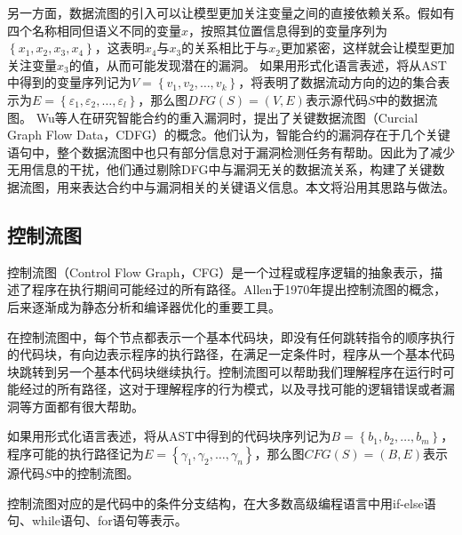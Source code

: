 
另一方面，数据流图的引入可以让模型更加关注变量之间的直接依赖关系。假如有四个名称相同但语义不同的变量$x$，按照其位置信息得到的变量序列为$\left\{x_1, x_2, x_3, x_4\right\}$，这表明$x_4$与$x_3$的关系相比于与$x_2$更加紧密，这样就会让模型更加关注变量$x_3$的值，从而可能发现潜在的漏洞。
如果用形式化语言表述，将从AST中得到的变量序列记为$V=\left\{v_1, v_2, \ldots, v_k\right\}$，将表明了数据流动方向的边的集合表示为$E=\left\{\varepsilon_1, \varepsilon_2, \ldots, \varepsilon_l\right\}$，那么图$DFG(S)=(V, E)$表示源代码$S$中的数据流图。
Wu等人\cite{wu2021peculiar}在研究智能合约的重入漏洞时，提出了关键数据流图（Curcial Graph Flow Data，CDFG）的概念。他们认为，智能合约的漏洞存在于几个关键语句中，整个数据流图中也只有部分信息对于漏洞检测任务有帮助。因此为了减少无用信息的干扰，他们通过剔除DFG中与漏洞无关的数据流关系，构建了关键数据流图，用来表达合约中与漏洞相关的关键语义信息。本文将沿用其思路与做法。
\subsection{控制流图}
\label{sec:控制流图}

控制流图（Control Flow Graph，CFG）是一个过程或程序逻辑的抽象表示，描述了程序在执行期间可能经过的所有路径。Allen于1970年提出控制流图的概念\cite{allencfg}，后来逐渐成为静态分析和编译器优化的重要工具。

在控制流图中，每个节点都表示一个基本代码块，即没有任何跳转指令的顺序执行的代码块，有向边表示程序的执行路径，在满足一定条件时，程序从一个基本代码块跳转到另一个基本代码块继续执行。控制流图可以帮助我们理解程序在运行时可能经过的所有路径，这对于理解程序的行为模式，以及寻找可能的逻辑错误或者漏洞等方面都有很大帮助。

如果用形式化语言表述，将从AST中得到的代码块序列记为$B=\left\{b_1, b_2,\ldots, b_m\right\}$，程序可能的执行路径记为$E=\left\{\gamma_1, \gamma_2, \ldots, \gamma_n\right\}$，那么图$CFG(S)=(B, E)$表示源代码$S$中的控制流图。


控制流图对应的是代码中的条件分支结构，在大多数高级编程语言中用if-else语句、while语句、for语句等表示。%


